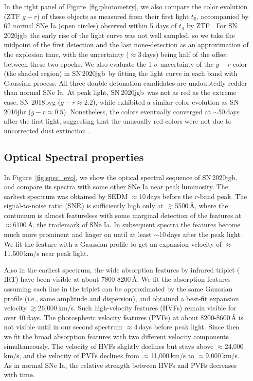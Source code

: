 \documentclass[twocolumn]{aastex631}
\newcommand\sn{SN\,2020jgb}
\begin{document}
In the right panel of Figure~\ref{fig:photometry}, we also compare the color evolution (ZTF $g-r$) of these objects as measured from their first light $t_\mathrm{fl}$, accompanied by 62 normal SNe Ia (open circles) observed within 5 days of $t_\mathrm{fl}$ by ZTF \citep[from][]{Bulla2020}. For \sn\, the early rise of the light curve was not well sampled, so we take the midpoint of the first detection and the last none-detection as an approximation of the explosion time, with the uncertainty ($\approx$3\,days) being half of the offset between these two epochs. We also evaluate the 1-$\sigma$ uncertainty of the $g-r$ color (the shaded region) in \sn\ by fitting the light curve in each band with Gaussian process. All three double detonation candidates are undoubtedly redder than normal SNe Ia. At peak light, \sn\ was not as red as the extreme case, SN 2018byg ($g-r\approx2.2$), while exhibited a similar color evolution as SN 2016jhr ($g-r\approx0.5$). Nonetheless, the colors eventually converged at $\sim$50\,days after the first light, suggesting that the unusually red colors were not due to uncorrected dust extinction \citep{de_18byg_2019}.

\subsection{Optical Spectral properties}
In Figure~\ref{fig:spec_evo}, we show the optical spectral sequence of \sn, and compare its spectra with some other SNe Ia near peak luminosity. The earliest spectrum was obtained by SEDM $\approx$10\,days before the $r$-band peak. The signal-to-noise ratio (SNR) is sufficiently high only at $\gtrsim$5500\,\r{A}, where the continuum is almost featureless with some marginal detection of the  features at $\approx$6100\,\r{A}, the trademark of SNe Ia. In subsequent spectra the  features become much more prominent and linger on until at least $\sim$10\,days after the peak light. We fit the  feature with a Gaussian profile to get an expansion velocity of $\approx$11,500\,km/s near peak light. 

Also in the earliest spectrum, the wide absorption features by  infrared triplet ( IRT) have been visible at about 7800-8200\,\r{A}. We fit the absorption features assuming each line in the triplet can be approximated by the same Gaussian profile (i.e., same amplitude and dispersion), and obtained a best-fit expansion velocity $\gtrsim$26,000\,km/s. Such high-velocity features (HVFs) remain visible for over 40\,days. The photospheric velocity features (PVFs) at about 8200-8600\,\r{A} is not visible until in our second spectrum $\approx$4\,days before peak light. Since then we fit the broad absorption features with two different velocity components simultaneously. The velocity of HVFs slightly declines but stays above $\approx$24,000\,km/s, and the velocity of PVFs declines from $\approx$11,000\,km/s to $\approx$9,000\,km/s. As in normal SNe Ia, the relative strength between HVFs and PVFs decreases with time.
\end{document}
